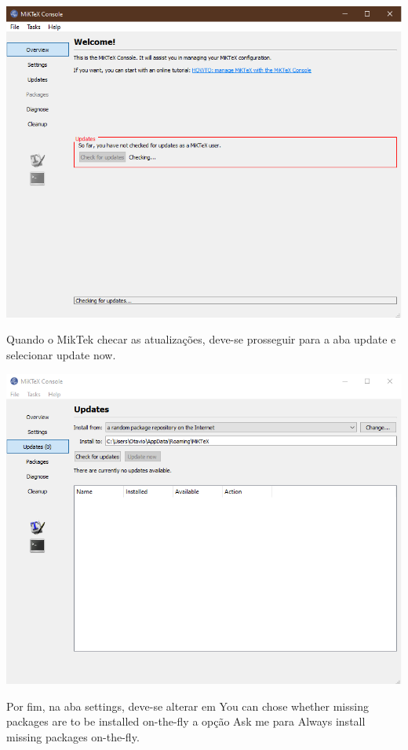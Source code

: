 \documentclass[
]{book}
\begin{document}
\begin{center}\includegraphics[width=1\linewidth]{img/01} \end{center}

Quando o MikTek checar as atualizações, deve-se prosseguir para a aba update e selecionar update now.

\begin{center}\includegraphics[width=1\linewidth]{img/02} \end{center}

Por fim, na aba settings, deve-se alterar em You can chose whether missing packages are to be installed on-the-fly a opção Ask me para Always install missing packages on-the-fly.
\end{document}

